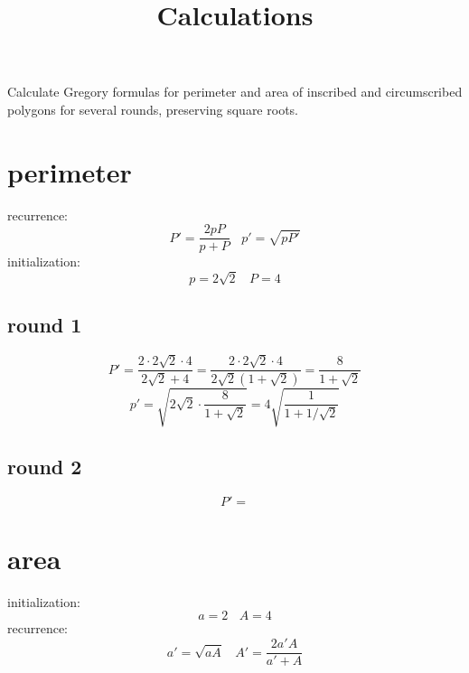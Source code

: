 \documentclass[11pt, oneside]{article}
\title{Calculations}
\date{}
\begin{document}
\maketitle
\Large
Calculate Gregory formulas for perimeter and area of inscribed and circumscribed polygons for several rounds, preserving square roots.

\section*{perimeter}
recurrence:
\[ P' = \frac{2pP}{p + P} \ \ \ \ p' = \sqrt{pP'} \]
initialization:
\[ p = 2 \sqrt{2} \ \ \ \ P = 4 \]
\subsection*{round 1}
\[ P' = \frac{2 \cdot 2 \sqrt{2} \cdot 4}{2 \sqrt{2} + 4} =   \frac{2 \cdot 2 \sqrt{2} \cdot 4}{2 \sqrt{2}(1 + \sqrt{2})} = \frac{8}{1 + \sqrt{2}} \]
\[ p' = \sqrt{2 \sqrt{2} \cdot \frac{8}{1 + \sqrt{2}}} = 4 \sqrt{\frac{1}{1 + 1/\sqrt{2}}}  \]
\subsection*{round 2}
\[ P' = \]

\section*{area}

initialization:
\[ a = 2 \ \ \ \ A = 4 \]
recurrence:
\[ a' =  \sqrt{aA} \ \ \ \  A' = \frac{2a'A}{a' + A} \]
\end{document}
